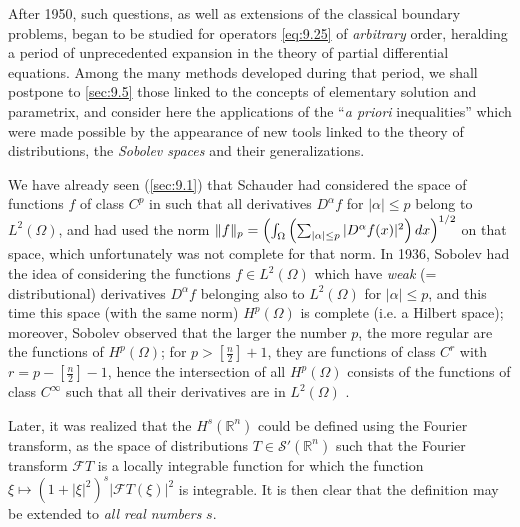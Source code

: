 \documentclass[12pt,a4paper,leqno,twoside]{extbook}
\DeclarePairedDelimiter{\norm}{\lVert}{\rVert}
\newcommand{\R}{\mathbb{R}}
\begin{document}
After 1950, such questions, as well as extensions of the classical boundary problems, began to be studied for operators \eqref{eq:9.25} of \emph{arbitrary} order, heralding a period of unprecedented expansion in the theory of partial differential equations. Among the many methods developed during that period, we shall postpone to \ref{sec:9.5} those linked to the concepts of elementary solution and parametrix, and consider here the applications of the ``\emph{a priori} inequalities'' which were made possible by the appearance of new tools linked to the theory of distributions, the \emph{Sobolev spaces} and their generalizations.

We have already seen (\ref{sec:9.1}) that Schauder had considered the space of functions \(f\) of class \(C^p\) in such that all derivatives \(D^\alpha f\) for \(|\alpha| \leq p\) belong to \(L^2(\Omega)\), and had used the norm \(\norm{f}_p = \left( \int_\Omega \left( \sum_{|\alpha| \leq p} |D^\alpha f(x)|^2 \right) dx \right)^{1/2}\) on that space, which unfortunately was not complete for that norm. In 1936, Sobolev had the idea of considering the functions \(f \in L^2(\Omega)\) which have \emph{weak} (= distributional) derivatives \(D^\alpha f\) belonging also to \(L^2(\Omega)\) for \(|\alpha| \leq p\), and this time this space (with the same norm) \(H^p(\Omega)\) is complete (i.e. a Hilbert space); moreover, Sobolev observed that the larger the number \(p\), the more regular are the functions of \(H^p(\Omega)\); for \(p > \left[ \frac{n}{2} \right] + 1\), they are functions of class \(C^r\) with \(r = p - \left[ \frac{n}{2} \right] - 1\), hence the intersection of all \(H^p(\Omega)\) consists of the functions of class \(C^\infty\) such that all their derivatives are in \(L^2(\Omega)\) \cite{201}.

Later, it was realized that the \(H^s(\R^n)\) could be defined using the Fourier transform, as the space of distributions \(T \in \mathcal{S}'(\R^n)\) such that the Fourier transform \(\mathcal{F}T\) is a locally integrable function for which the function \(\xi \mapsto (1 + |\xi|^2)^s |\mathcal{F}T(\xi)|^2\) is integrable. It is then clear that the definition may be extended to \emph{all real numbers} \(s\).
\end{document}
